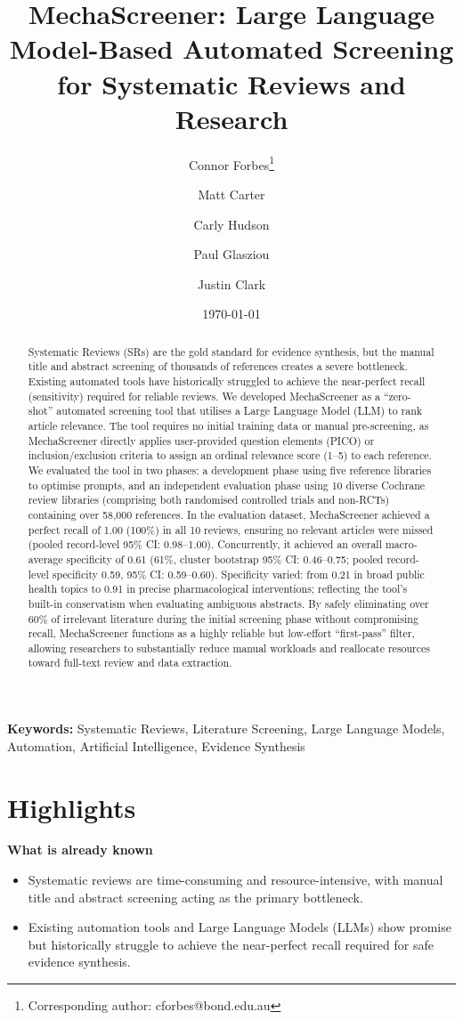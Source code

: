 \documentclass[11pt,a4paper]{article}
\title{MechaScreener: Large Language Model-Based Automated Screening for Systematic Reviews and Research}
\author[1]{Connor Forbes\thanks{Corresponding author: cforbes@bond.edu.au}}
\author[1]{Matt Carter}
\author[2,3]{Carly Hudson}
\author[1]{Paul Glasziou}
\author[1]{Justin Clark}
\affil[1]{Institute for Evidence-Based Healthcare, Bond University, Gold Coast, Australia}
\affil[2]{Faculty of Health Sciences and Medicine, Bond University, Gold Coast, Australia}
\affil[3]{Bond Business School, Bond University, Gold Coast, Australia}
\date{\today}
\begin{document}
\maketitle

\noindent \textbf{Keywords:} Systematic Reviews, Literature Screening, Large Language Models, Automation, Artificial Intelligence, Evidence Synthesis

\begin{abstract}
Systematic Reviews (SRs) are the gold standard for evidence synthesis, but the manual title and abstract screening of thousands of references creates a severe bottleneck. Existing automated tools have historically struggled to achieve the near-perfect recall (sensitivity) required for reliable reviews. We developed MechaScreener as a ``zero-shot'' automated screening tool that utilises a Large Language Model (LLM) to rank article relevance. The tool requires no initial training data or manual pre-screening, as MechaScreener directly applies user-provided question elements (PICO) or inclusion/exclusion criteria to assign an ordinal relevance score (1--5) to each reference. %
We evaluated the tool in two phases: a development phase using five reference libraries to optimise prompts, and an independent evaluation phase using 10 diverse Cochrane review libraries (comprising both randomised controlled trials and non-RCTs) containing over 58,000 references.
In the evaluation dataset, MechaScreener achieved a perfect recall of 1.00 (100\%) in all 10 reviews, ensuring no relevant articles were missed (pooled record-level 95\% CI: 0.98--1.00). Concurrently, it achieved an overall macro-average specificity of 0.61 (61\%, cluster bootstrap 95\% CI: 0.46--0.75; pooled record-level specificity 0.59, 95\% CI: 0.59--0.60). Specificity varied: from 0.21 in broad public health topics to 0.91 in precise pharmacological interventions; reflecting the tool's built-in conservatism when evaluating ambiguous abstracts. By safely eliminating over 60\% of irrelevant literature during the initial screening phase without compromising recall, MechaScreener functions as a highly reliable but low-effort ``first-pass'' filter, allowing researchers to substantially reduce manual workloads and reallocate resources toward full-text review and data extraction.
\end{abstract}

\section*{Highlights}
\noindent\textbf{What is already known}
\begin{itemize}
    \item Systematic reviews are time-consuming and resource-intensive, with manual title and abstract screening acting as the primary bottleneck.
    \item Existing automation tools and Large Language Models (LLMs) show promise but historically struggle to achieve the near-perfect recall required for safe evidence synthesis.
\end{itemize}
\end{document}
